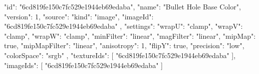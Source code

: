 {
  "id": "6cd819fe150c7fc529e1944eb69edaba",
  "name": "Bullet Hole Base Color",
  "version": 1,
  "source": {
    "kind": "image",
    "imageId": "6cd819fe150c7fc529e1944eb69edaba"
  },
  "settings": {
    "wrapU": "clamp",
    "wrapV": "clamp",
    "wrapW": "clamp",
    "minFilter": "linear",
    "magFilter": "linear",
    "mipMap": true,
    "mipMapFilter": "linear",
    "anisotropy": 1,
    "flipY": true,
    "precision": "low",
    "colorSpace": "srgb"
  },
  "textureIds": [
    "6cd819fe150c7fc529e1944eb69edaba"
  ],
  "imageIds": [
    "6cd819fe150c7fc529e1944eb69edaba"
  ]
}
